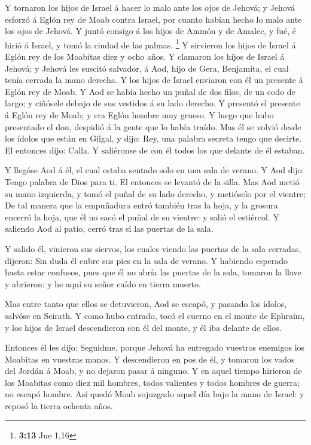  Y tornaron los hijos de Israel á hacer lo malo ante los
ojos de Jehová; y Jehová esforzó á Eglón rey de Moab contra Israel, por
cuanto habían hecho lo malo ante los ojos de Jehová.  Y
juntó consigo á los hijos de Ammón y de Amalec, y fué, é hirió á Israel,
y tomó la ciudad de las palmas. \footnote{\textbf{3:13} Jue 1,16}
 Y sirvieron los hijos de Israel á Eglón rey de los
Moabitas diez y ocho años.  Y clamaron los hijos de Israel
á Jehová; y Jehová les suscitó salvador, á Aod, hijo de Gera, Benjamita,
el cual tenía cerrada la mano derecha. Y los hijos de Israel enviaron
con él un presente á Eglón rey de Moab.  Y Aod se había
hecho un puñal de dos filos, de un codo de largo; y ciñósele debajo de
sus vestidos á su lado derecho.  Y presentó el presente á
Eglón rey de Moab; y era Eglón hombre muy grueso.  Y luego
que hubo presentado el don, despidió á la gente que lo había traído.
 Mas él se volvió desde los ídolos que están en Gilgal, y
dijo: Rey, una palabra secreta tengo que decirte. El entonces dijo:
Calla. Y saliéronse de con él todos los que delante de él estaban.

 Y llegóse Aod á él, el cual estaba sentado solo en una
sala de verano. Y Aod dijo: Tengo palabra de Dios para ti. El entonces
se levantó de la silla.  Mas Aod metió su mano izquierda, y
tomó el puñal de su lado derecho, y metióselo por el vientre;
 De tal manera que la empuñadura entró también tras la
hoja, y la grosura encerró la hoja, que él no sacó el puñal de su
vientre: y salió el estiércol.  Y saliendo Aod al patio,
cerró tras sí las puertas de la sala.

 Y salido él, vinieron sus siervos, los cuales viendo las
puertas de la sala cerradas, dijeron: Sin duda él cubre sus pies en la
sala de verano.  Y habiendo esperado hasta estar confusos,
pues que él no abría las puertas de la sala, tomaron la llave y
abrieron: y he aquí su señor caído en tierra muerto.

 Mas entre tanto que ellos se detuvieron, Aod se escapó, y
pasando los ídolos, salvóse en Seirath.  Y como hubo
entrado, tocó el cuerno en el monte de Ephraim, y los hijos de Israel
descendieron con él del monte, y él iba delante de ellos.

 Entonces él les dijo: Seguidme, porque Jehová ha entregado
vuestros enemigos los Moabitas en vuestras manos. Y descendieron en pos
de él, y tomaron los vados del Jordán á Moab, y no dejaron pasar á
ninguno.  Y en aquel tiempo hirieron de los Moabitas como
diez mil hombres, todos valientes y todos hombres de guerra; no escapó
hombre.  Así quedó Moab sojuzgado aquel día bajo la mano de
Israel: y reposó la tierra ochenta años.

